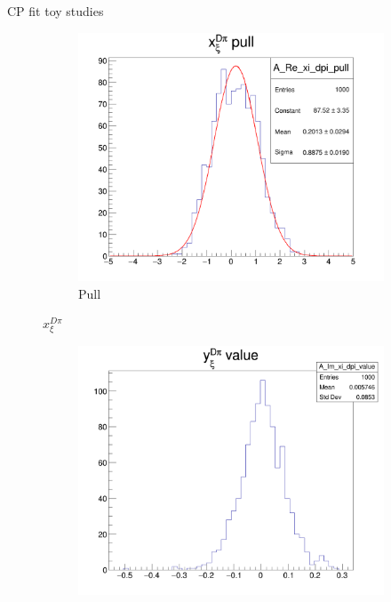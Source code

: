 \documentclass{beamer}
\begin{document}
\begin{frame}{CP fit toy studies}
\begin{figure}
    \begin{subfigure}{0.25\textwidth}
      \includegraphics[width = 1.0\textwidth]{Plots/A_Re_xi_dpi_pull.png}
      \caption{Pull}
    \end{subfigure}
    \caption{$x_\xi^{D\pi}$}
  \end{figure}
  \begin{figure}
    \centering
    \vspace{-0.15cm}
    \begin{subfigure}{0.25\textwidth}
      \includegraphics[width = 1.0\textwidth]{Plots/A_Im_xi_dpi_value.png}

\end{subfigure}
\end{figure}
\end{frame}
\end{document}
